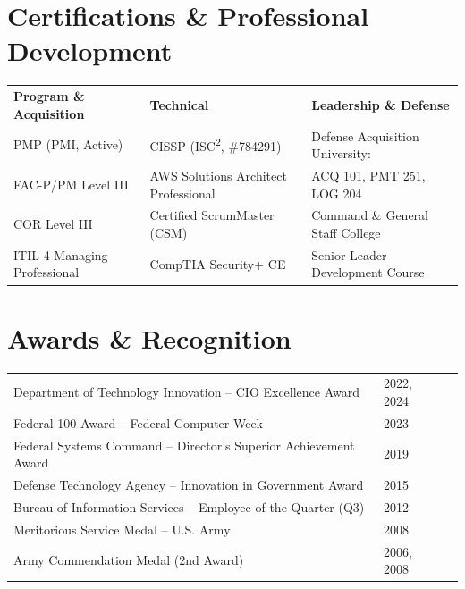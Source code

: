 \documentclass[11pt,letterpaper]{article}
\begin{document}
\section{Certifications \& Professional Development}

\begin{tabularx}{\textwidth}{@{}>{\raggedright\arraybackslash}p{}>{\raggedright\arraybackslash}p{}>{\raggedright\arraybackslash}X@{}}
  \small\textbf{Program \& Acquisition} & \small\textbf{Technical} & \small\textbf{Leadership \& Defense}\\[4pt]
  PMP (PMI, Active)       & CISSP (ISC\textsuperscript{2}, \#784291) & Defense Acquisition University:\\
  FAC-P/PM Level III      & AWS Solutions Architect Professional & \qquad ACQ 101, PMT 251, LOG 204\\
  COR Level III           & Certified ScrumMaster (CSM) & Command \& General Staff College\\
  ITIL 4 Managing Professional & CompTIA Security+ CE & Senior Leader Development Course\\
\end{tabularx}

\section{Awards \& Recognition}

\begin{tabularx}{\textwidth}{@{}p{}p{}>{\raggedleft\arraybackslash}X@{}}
  Department of Technology Innovation -- CIO Excellence Award & \small 2022, 2024 & \\
  Federal 100 Award -- Federal Computer Week & \small 2023 & \\
  Federal Systems Command -- Director's Superior Achievement Award & \small 2019 & \\
  Defense Technology Agency -- Innovation in Government Award & \small 2015 & \\
  Bureau of Information Services -- Employee of the Quarter (Q3) & \small 2012 & \\
  Meritorious Service Medal -- U.S. Army & \small 2008 & \\
  Army Commendation Medal (2nd Award) & \small 2006, 2008 & \\
\end{tabularx}
\end{document}
